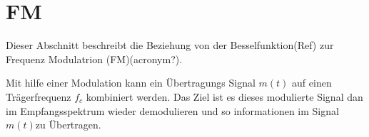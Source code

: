%
%
% 
%
\chapter{FM\label{chapter:fm}}
\begin{refsection}


Dieser Abschnitt beschreibt die Beziehung von der Besselfunktion(Ref) zur Frequenz Modulatrion (FM)(acronym?).

Mit hilfe einer Modulation kann ein Übertragungs Signal \(m(t)\) auf einen Trägerfrequenz \( f_c \) kombiniert werden.
Das Ziel ist es dieses modulierte Signal dan im Empfangsspektrum wieder demodulieren und so informationen im Signal \( m(t) \)zu Übertragen.







\printbibliography[heading=subbibliography]
\end{refsection}

%
